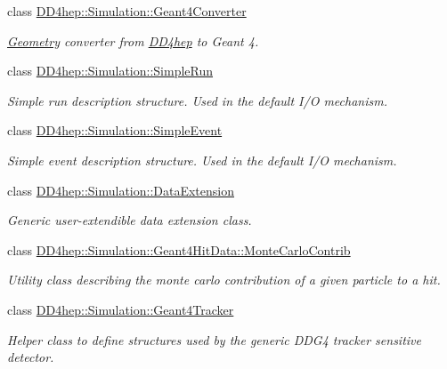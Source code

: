 \begin{DoxyCompactItemize}
class \hyperlink{class_d_d4hep_1_1_simulation_1_1_geant4_converter}{DD4hep::Simulation::Geant4Converter}
\begin{DoxyCompactList}\small\item\em \hyperlink{namespace_d_d4hep_1_1_geometry}{Geometry} converter from \hyperlink{namespace_d_d4hep}{DD4hep} to Geant 4. \item\end{DoxyCompactList}\item 
class \hyperlink{class_d_d4hep_1_1_simulation_1_1_simple_run}{DD4hep::Simulation::SimpleRun}
\begin{DoxyCompactList}\small\item\em Simple run description structure. Used in the default I/O mechanism. \item\end{DoxyCompactList}\item 
class \hyperlink{class_d_d4hep_1_1_simulation_1_1_simple_event}{DD4hep::Simulation::SimpleEvent}
\begin{DoxyCompactList}\small\item\em Simple event description structure. Used in the default I/O mechanism. \item\end{DoxyCompactList}\item 
class \hyperlink{class_d_d4hep_1_1_simulation_1_1_data_extension}{DD4hep::Simulation::DataExtension}
\begin{DoxyCompactList}\small\item\em Generic user-\/extendible data extension class. \item\end{DoxyCompactList}\item 
class \hyperlink{class_d_d4hep_1_1_simulation_1_1_geant4_hit_data_1_1_monte_carlo_contrib}{DD4hep::Simulation::Geant4HitData::MonteCarloContrib}
\begin{DoxyCompactList}\small\item\em Utility class describing the monte carlo contribution of a given particle to a hit. \item\end{DoxyCompactList}\item 
class \hyperlink{class_d_d4hep_1_1_simulation_1_1_geant4_tracker}{DD4hep::Simulation::Geant4Tracker}
\begin{DoxyCompactList}\small\item\em Helper class to define structures used by the generic DDG4 tracker sensitive detector. \item\end{DoxyCompactList}\item 

\end{DoxyCompactItemize}
